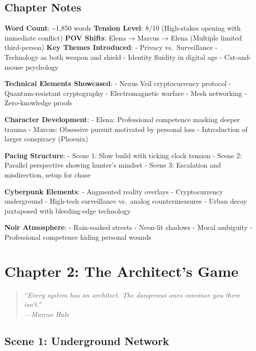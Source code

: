 \documentclass[12pt,letterpaper]{book}
\begin{document}
\hypertarget{chapter-notes}{%
\subsection{Chapter Notes}\label{chapter-notes}}

\textbf{Word Count}: \textasciitilde1,850 words \textbf{Tension Level}: 8/10 (High-stakes opening with immediate conflict) \textbf{POV Shifts}: Elena → Marcus → Elena (Multiple limited third-person) \textbf{Key Themes Introduced}: - Privacy vs.~Surveillance - Technology as both weapon and shield - Identity fluidity in digital age - Cat-and-mouse psychology

\textbf{Technical Elements Showcased}: - Nexus Veil cryptocurrency protocol - Quantum-resistant cryptography - Electromagnetic warfare - Mesh networking - Zero-knowledge proofs

\textbf{Character Development}: - Elena: Professional competence masking deeper trauma - Marcus: Obsessive pursuit motivated by personal loss - Introduction of larger conspiracy (Phoenix)

\textbf{Pacing Structure}: - Scene 1: Slow build with ticking clock tension - Scene 2: Parallel perspective showing hunter's mindset - Scene 3: Escalation and misdirection, setup for chase

\textbf{Cyberpunk Elements}: - Augmented reality overlays - Cryptocurrency underground - High-tech surveillance vs.~analog countermeasures - Urban decay juxtaposed with bleeding-edge technology

\textbf{Noir Atmosphere}: - Rain-soaked streets - Neon-lit shadows - Moral ambiguity - Professional competence hiding personal wounds


\hypertarget{chapter-2-the-architects-game}{%
\section{Chapter 2: The Architect's Game}\label{chapter-2-the-architects-game}}

\begin{quote}
\itshape ``Every system has an architect. The dangerous ones convince you there
isn't.''\\
\normalfont\hfill---Marcus Hale
\end{quote}

\hypertarget{scene-1-underground-network}{%
\subsection{Scene 1: Underground Network}\label{scene-1-underground-network}}
\end{document}
